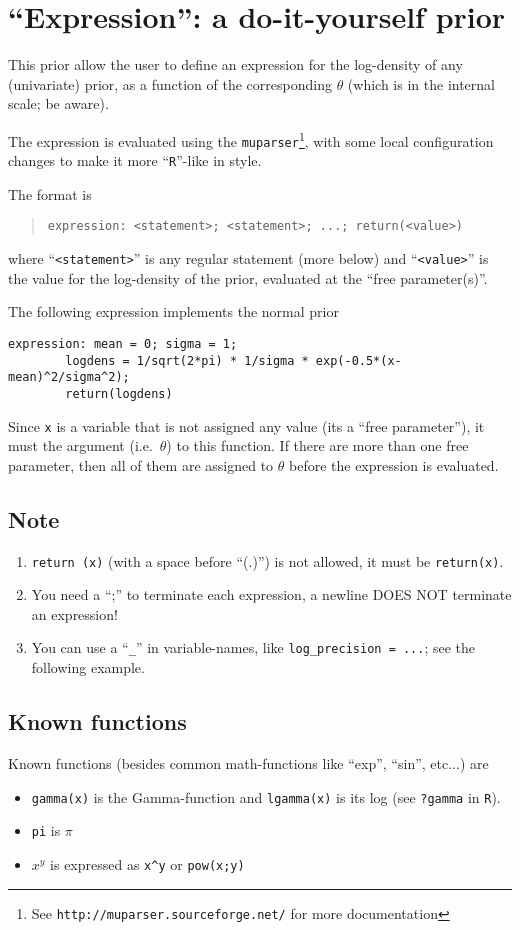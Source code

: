 \documentclass[a4paper,11pt]{article}
\begin{document}
\section*{``Expression'': a do-it-yourself prior}

This prior allow the user to define an expression for the log-density
of any (univariate) prior, as a function of the corresponding $\theta$
(which is in the internal scale; be aware).

The expression is evaluated using the \texttt{muparser}\footnote{See
    \texttt{http://muparser.sourceforge.net/} for more documentation},
with some local configuration changes to make it more
``\texttt{R}''-like in style.

The format is
\begin{quote}
    \texttt{expression: <statement>; <statement>; ...; return(<value>)}
\end{quote}
where ``\texttt{<statement>}'' is any regular statement (more below)
and ``\texttt{<value>}'' is the value for the log-density of the
prior, evaluated at the ``free parameter(s)''.

The following expression implements the normal prior
\begin{verbatim}
expression: mean = 0; sigma = 1;
        logdens = 1/sqrt(2*pi) * 1/sigma * exp(-0.5*(x-mean)^2/sigma^2);
        return(logdens)
\end{verbatim}
Since \verb|x| is a variable that is not assigned any value (its a
``free parameter''), it must the argument (i.e.\ $\theta$) to this
function. If there are more than one free parameter, then all of them
are assigned to $\theta$ before the expression is evaluated.

\subsection*{Note}
\begin{enumerate}
\item \verb|return (x)| (with a space before ``(.)'') is not allowed,
    it must be \verb|return(x)|.
\item You need a ``;'' to terminate each expression, a newline DOES
    NOT terminate an expression!
\item You can use a ``\verb|_|'' in variable-names,
    like \verb|log_precision = ...|; see the following example. 
\end{enumerate}

\subsection*{Known functions}
Known functions (besides common math-functions like ``exp'',
``sin'', etc...) are 
\begin{itemize}
\item \verb|gamma(x)| is the Gamma-function and \verb|lgamma(x)| is
    its log (see \verb|?gamma| in \verb|R|).
\item \verb|pi| is $\pi$
\item $x^y$ is expressed as  \verb|x^y| or \verb|pow(x;y)|
\end{itemize}
\end{document}
